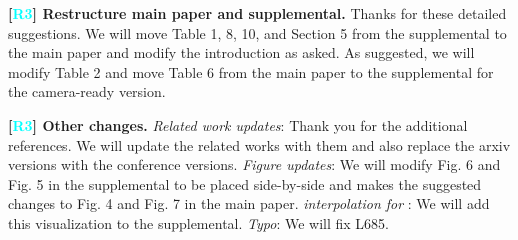 \documentclass[10pt,twocolumn,letterpaper]{article}
\newcommand{\Rthree}{\textcolor{cyan}{R3}}
\begin{document}
\begin{table}[b]
\centering
\captionsetup{font=small}
  \vspace*{-0.2in}
    \vspace*{-0.1in}
    \caption{We report mean  std-dev of MIPNet over five runs on the COCO \texttt{val} set with ground-truth bounding boxes using  input resolution. H-@ stands for HRNet-W@ backbone.}
    \label{tab:averaged_runs}
    \vspace*{-0.2in}
\end{table}

















%
 


\vspace{1.5mm}\noindent
\textbf{[\Rthree] Restructure main paper and supplemental.} Thanks for these detailed suggestions. We will move Table 1, 8, 10, and Section 5 from the supplemental to the main paper and modify the introduction as asked. As suggested, we will modify Table 2 and move Table 6 from the main paper to the supplemental for the camera-ready version.



\vspace{1.5mm}\noindent
\textbf{[\Rthree] Other changes.} \textit{Related work updates}: Thank you for the additional references. We will update the related works with them and also replace the arxiv versions with the conference versions. \textit{Figure updates}: We will modify Fig. 6 and Fig. 5 in the supplemental to be placed side-by-side and makes the suggested changes to Fig. 4 and Fig. 7 in the main paper. \textit{ interpolation for }: We will add this visualization to the supplemental. \textit{Typo}: We will fix L685.
\end{document}

